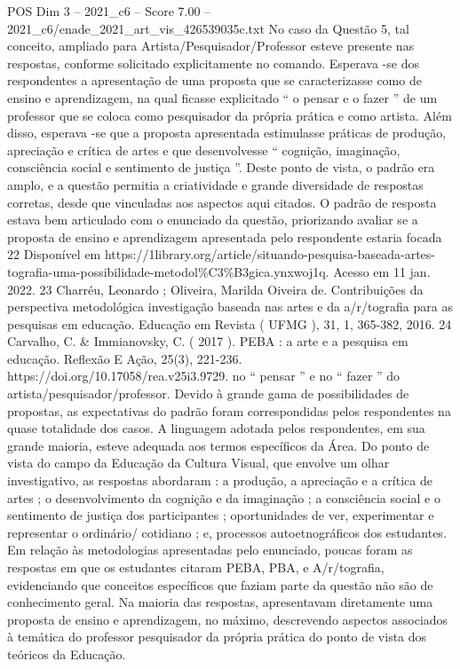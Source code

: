 \begin{textsample}{POS Dim 3 – 2021\_c6 – Score 7.00 – 2021\_c6/enade\_2021\_art\_vis\_426539035c.txt}
No caso da Questão 5, tal conceito, ampliado para Artista/Pesquisador/Professor esteve presente nas respostas, conforme solicitado explicitamente no comando.
Esperava -se dos respondentes a apresentação de uma proposta que se caracterizasse como de ensino e aprendizagem, na qual ficasse explicitado “ o pensar e o fazer ” de um professor que se coloca como pesquisador da própria prática e como artista.
Além disso, esperava -se que a proposta apresentada estimulasse práticas de produção, apreciação e crítica de artes e que desenvolvesse “ cognição, imaginação, consciência social e sentimento de justiça ”.
Deste ponto de vista, o padrão era amplo, e a questão permitia a criatividade e grande diversidade de respostas corretas, desde que vinculadas aos aspectos aqui citados.
O padrão de resposta estava bem articulado com o enunciado da questão, priorizando avaliar se a proposta de ensino e aprendizagem apresentada pelo respondente estaria focada 22 Disponível em https://1library.org/article/situando-pesquisa-baseada-artes-tografia-uma-possibilidade-metodol\%C3\%B3gica.ynxwoj1q.
Acesso em 11 jan. 2022. 23 Charréu, Leonardo ; Oliveira, Marilda Oiveira de.
Contribuições da perspectiva metodológica investigação baseada nas artes e da a/r/tografia para as pesquisas em educação.
Educação em Revista ( UFMG ), 31, 1, 365-382, 2016. 24 Carvalho, C. \& Immianovsky, C. ( 2017 ).
PEBA : a arte e a pesquisa em educação.
Reflexão E Ação, 25(3), 221-236. https://doi.org/10.17058/rea.v25i3.9729. no “ pensar ” e no “ fazer ” do artista/pesquisador/professor.
Devido à grande gama de possibilidades de propostas, as expectativas do padrão foram correspondidas pelos respondentes na quase totalidade dos casos.
A linguagem adotada pelos respondentes, em sua grande maioria, esteve adequada aos termos específicos da Área.
Do ponto de vista do campo da Educação da Cultura Visual, que envolve um olhar investigativo, as respostas abordaram : a produção, a apreciação e a crítica de artes ; o desenvolvimento da cognição e da imaginação ; a consciência social e o sentimento de justiça dos participantes ; oportunidades de ver, experimentar e representar o ordinário/ cotidiano ; e, processos autoetnográficos dos estudantes.
Em relação às metodologias apresentadas pelo enunciado, poucas foram as respostas em que os estudantes citaram PEBA, PBA, e A/r/tografia, evidenciando que conceitos específicos que faziam parte da questão não são de conhecimento geral.
Na maioria das respostas, apresentavam diretamente uma proposta de ensino e aprendizagem, no máximo, descrevendo aspectos associados à temática do professor pesquisador da própria prática do ponto de vista dos teóricos da Educação.

\end{textsample}
